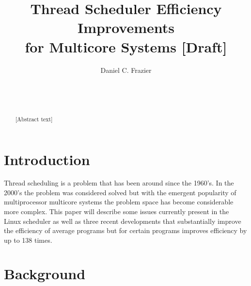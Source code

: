 \documentclass{sig-alternate}
\begin{document}

\title{Thread Scheduler Efficiency Improvements \\ for Multicore Systems [Draft]}


\author{
\alignauthor
Daniel C. Frazier\\
	\\
	\\
	\\
}
\maketitle


\begin{abstract}
[Abstract text]
\end{abstract}


\section{Introduction}
\label{sec:intro}

Thread scheduling is a problem that has been around since the 1960's. In the 2000's the problem was considered solved but with the emergent popularity of multiprocessor multicore systems the problem space has become considerable more complex. This paper will describe some issues currently present in the Linux scheduler as well as three recent developments that substantially improve the efficiency of average programs but for certain programs improves efficiency by up to 138 times.

\section{Background}
\label{sec:bg}
\end{document}

